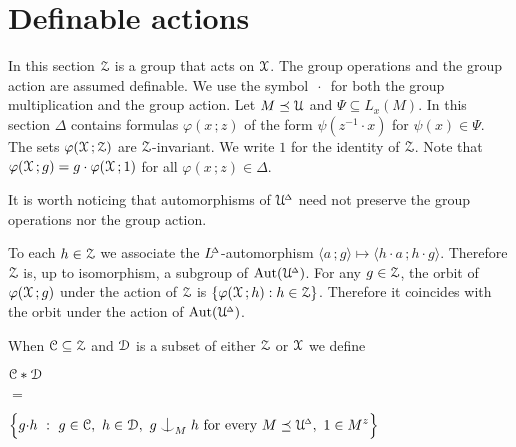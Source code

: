 \section{Definable actions}
\label{definable}

\def\ceq#1#2#3{\noindent\parbox[t]{15ex}{$\displaystyle #1$}\parbox{6ex}{\hfil $#2$}{$\displaystyle #3$}}

In this section $\EuScript Z$ is a group that acts on $\EuScript X$.
The group operations and the group action are assumed definable.
We use the symbol $\,\cdot\,$ for both the group multiplication and the group action.
Let $M\preceq\EuScript U$ and $\Psi\subseteq L_x(M)$.
In this section $\Delta$ contains formulas $\varphi(x\,;z)$ of the form $\psi(z^{-1}\!\cdot x)$ for $\psi(x)\in\Psi$.
The sets $\varphi(\EuScript X\,;\EuScript Z)$ are $\EuScript Z$-invariant.
We write $1$ for the identity of $\EuScript Z$.
Note that $\varphi(\EuScript X\,;g)=g\cdot\varphi(\EuScript X\,;1)$ for all $\varphi(x\,;z)\in\Delta$.

It is worth noticing that automorphisms of $\EuScript U\kern-.2ex^{\scriptscriptstyle\Delta}$ need not preserve the group operations nor the group action.

To each $h\in\EuScript Z$ we associate the $L\kern-.4ex^{\scriptscriptstyle\Delta}$-automorphism $\langle a\,;g\rangle\mapsto\langle h{\cdot}a\,;h{\cdot}g\rangle$.
Therefore $\EuScript Z$ is, up to isomorphism, a subgroup of ${\rm Aut}(\EuScript U\kern-.2ex^{\scriptscriptstyle\Delta})$.
For any $g\in\EuScript Z$, the orbit of $\varphi(\EuScript X\,;g)$ under the action of $\EuScript Z$ is $\{\varphi(\EuScript X\,;h) : h\in\EuScript Z\}$.
Therefore it coincides with the orbit under the action of ${\rm Aut}(\EuScript U\kern-.2ex^{\scriptscriptstyle\Delta})$.

When $\EuScript C\subseteq\EuScript Z$ and $\EuScript D$ is a subset of either $\EuScript Z$ or $\EuScript X$ we define

\ceq{\hfill\C*\D}{=}{\Big\{g{\cdot}h\ :\ g\in\C,\ h\in\D,\ g\nonfork_M h\text{ for every }M\preceq\UDelta,\ 1\in M^z\Big\}}



